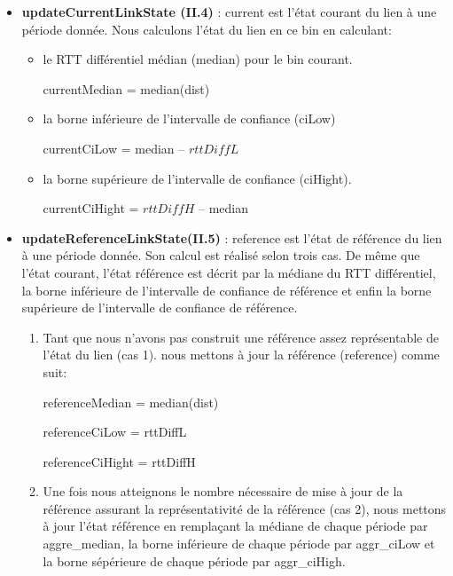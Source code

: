 \begin{itemize}
\begin{enumerate}
\end{enumerate}


 \item \textbf{updateCurrentLinkState (II.4)} :  {\color{gray}current}  est l'état courant du lien à une période donnée.  Nous calculons l'état du lien en ce bin en calculant:
 
 \begin{itemize}[label=$\square$]
 	\item le RTT différentiel médian ({\color{gray}median}) pour le bin courant.
 	
 	{\color{gray}currentMedian} = median(dist) 
 	
 	\item  la borne inférieure de l'intervalle de confiance ({\color{gray}ciLow})
 	
 	{\color{gray}currentCiLow} = {\color{gray}median} --  $ rttDiffL $
 	
 	\item   la borne supérieure de l'intervalle de confiance ({\color{gray}ciHight}).
 	
 	{\color{gray}currentCiHight} =  $ rttDiffH$ --  {\color{gray}median}
 	
 \end{itemize}

\item \textbf{ updateReferenceLinkState(II.5)} :  {\color{gray}reference}  est l'état de référence du lien à une période donnée. Son calcul est réalisé selon trois cas. De même que l'état courant, l'état référence est décrit par la médiane du RTT différentiel, la borne inférieure de l'intervalle de confiance de référence et enfin la borne supérieure de l'intervalle de confiance de référence.

\begin{enumerate}
	\item Tant que nous n'avons pas construit une référence assez représentable de l'état du lien (cas 1).  nous mettons à jour la référence ({reference}) comme suit: 
	
	referenceMedian = median(dist)
	
	referenceCiLow = rttDiffL
	
	referenceCiHight = rttDiffH
	
	\item Une fois nous atteignons le nombre nécessaire de  mise à jour de la référence assurant la représentativité de la référence (cas 2), nous mettons à jour l'état référence en remplaçant la médiane de chaque période par aggre\_median, la borne inférieure  de chaque période par  aggr\_ciLow et la borne sépérieure de chaque période par aggr\_ciHigh.
	\begin{itemize}
		

\end{itemize}
\end{enumerate}
\end{itemize}

